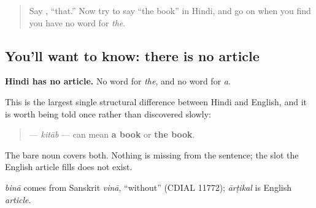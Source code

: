 \label{lesson:HI-C86-koi-article}



\begin{quote}
Say \textbf{}, \textquotedblleft{}that.\textquotedblright{} Now try to say \textquotedblleft{}the book\textquotedblright{} in Hindi, and go on when you find you have no word for \emph{the}.
\end{quote}

\subsection*{You'll want to know: there is no article}
\textbf{Hindi has no article.} No word for \emph{the}, and no word for \emph{a}.

This is the largest single structural difference between Hindi and English, and it is worth being told once rather than discovered slowly:

\begin{quote}
\textbf{} — \emph{kitāb} — can mean \textbf{a book} or \textbf{the book}.
\end{quote}

The bare noun covers both. Nothing is missing from the sentence; the slot the English article fills does not exist.

\begin{cousinweb}
\emph{binā} comes from Sanskrit \emph{vinā}, \textquotedblleft{}without\textquotedblright{} (CDIAL 11772); \emph{ārṭikal} is English \emph{article}.
\end{cousinweb}

